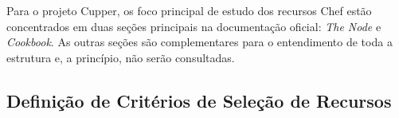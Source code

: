 Para o projeto Cupper, os foco principal de estudo dos recursos Chef estão
concentrados em duas seções principais na documentação oficial: \textit{The Node} e
\textit{Cookbook}. As outras seções são complementares para o entendimento de toda
a estrutura e, a princípio, não serão consultadas.

\subsection{Definição de Critérios de Seleção de Recursos}
\label{sec:defcritrecurso}



